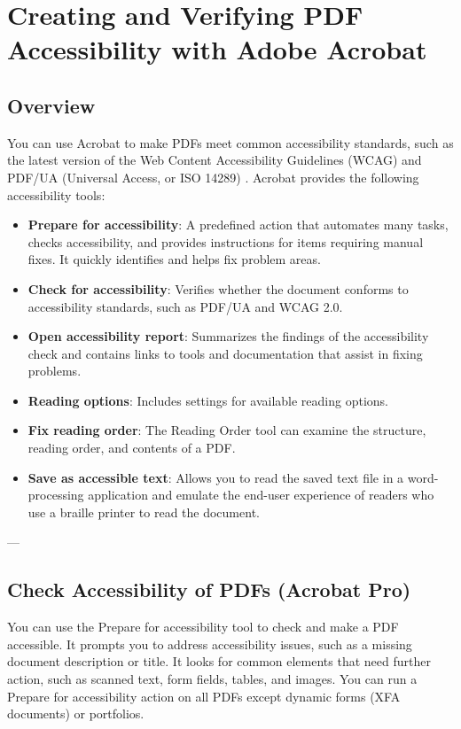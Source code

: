\chapter{Creating and Verifying PDF Accessibility with Adobe Acrobat}
\label{chap:pdf-accessibility-acrobat}

\section{Overview}
\label{sec:acrobat-overview}
You can use Acrobat to make PDFs meet common accessibility standards, such as the latest version of the Web Content Accessibility Guidelines (WCAG) and PDF/UA (Universal Access, or ISO 14289) \cite{AdobeHelpX}. Acrobat provides the following accessibility tools:

\begin{itemize}
    \item \textbf{Prepare for accessibility}: A predefined action that automates many tasks, checks accessibility, and provides instructions for items requiring manual fixes. It quickly identifies and helps fix problem areas.
    \item \textbf{Check for accessibility}: Verifies whether the document conforms to accessibility standards, such as PDF/UA and WCAG 2.0.
    \item \textbf{Open accessibility report}: Summarizes the findings of the accessibility check and contains links to tools and documentation that assist in fixing problems.
    \item \textbf{Reading options}: Includes settings for available reading options.
    \item \textbf{Fix reading order}: The Reading Order tool can examine the structure, reading order, and contents of a PDF.
    \item \textbf{Save as accessible text}: Allows you to read the saved text file in a word-processing application and emulate the end-user experience of readers who use a braille printer to read the document.
\end{itemize}


---


\section{Check Accessibility of PDFs (Acrobat Pro)}
\label{sec:acrobat-check-accessibility}
You can use the Prepare for accessibility tool to check and make a PDF accessible. It prompts you to address accessibility issues, such as a missing document description or title. It looks for common elements that need further action, such as scanned text, form fields, tables, and images. You can run a Prepare for accessibility action on all PDFs except dynamic forms (XFA documents) or portfolios\footnotemark[1].


